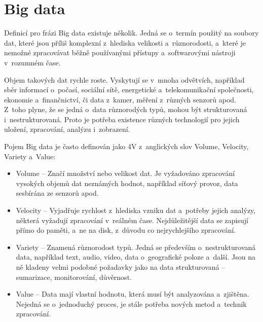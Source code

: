 \section{Big data} \label{bigDataSection}
Definicí pro frázi Big data existuje několik. Jedná se o~termín použitý na soubory dat, které jsou příliš komplexní z~hlediska velikosti a~různorodosti, a~které je nemožné zpracovávat běžně používanými přístupy a~softwarovými nástroji v~rozumném čase.

Objem takových dat rychle roste. Vyskytují se v~mnoha odvětvích, například sběr informací o~počasí, sociální sítě, energetické a~telekomunikační společnosti, ekonomie a~finančnictví, či data z~kamer, měření z~různých senzorů apod. Z~toho plyne, že se jedná o~data různorodých typů, mohou být strukturovaná i~nestrukturovaná. Proto je potřeba existence různých technologií pro jejich uložení, zpracování, analýzu i~zobrazení.


\vspace{0.5cm}

\noindent Pojem Big data je často definován jako 4V z~anglických slov Volume, Velocity, Variety a~Value: \cite{oracleBigData}

\begin{itemize}
\item Volume – Značí množství nebo velikost dat. Je vyžadováno zpracování vysokých objemů dat neznámých hodnot, například síťový provoz, data sesbírána ze senzorů apod.

\item Velocity – Vyjadřuje rychlost z~hlediska vzniku dat a~potřeby jejich analýzy, některá vyžadují zpracování v~reálném čase. Nejdůležitější data se zapisují přímo do paměti, a~ne na disk, z~důvodu co nejrychlejšího zpracování.

\item Variety – Znamená různorodost typů. Jedná se především o~nestrukturovaná data, například text, audio, video, data o~geografické poloze a~další. Jsou na ně kladeny velmi podobné požadavky jako na data strukturovaná – sumarizace, monitorování, důvěrnost. \cite{oracleBigData}

\item Value – Data mají vlastní hodnotu, která musí být analyzována a~zjištěna. Nejedná se o~jednoduchý proces, je stále potřeba nových metod a~technik zpracování.
\end{itemize}

